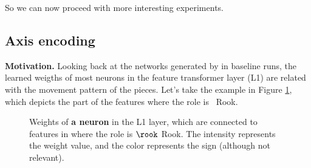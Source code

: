 So we can now proceed with more interesting experiments.

\newpage
\subsection{Axis encoding} %
\label{sec:axis_encoding}

\newcommand{\axisarrows}[1]{\parbox{0.7cm}{\texttt{[image: ../assets/arrows/\#1.pdf]}}}
\newcommand{\axisarrowsSM}[1]{\parbox{0.6cm}{\texttt{[image: ../assets/arrows/\#1.pdf]}}}

\textbf{Motivation.} Looking back at the networks generated by  in baseline runs, the learned weigths of most neurons in the feature transformer layer (L1) are related with the movement pattern of the pieces. Let's take the example in Figure \ref{fig:rook_weights}, which depicts the  part of the features where the role is \symrook\ Rook.

\begin{figure}[h]
\centering
{}%
\qquad
{}%
\caption{Weights of \textbf{a neuron} in the L1 layer, which are connected to features in  where the role is $\rook$ Rook. The intensity represents the weight value, and the color represents the sign (although not relevant).}
\label{fig:rook_weights}
\end{figure}

